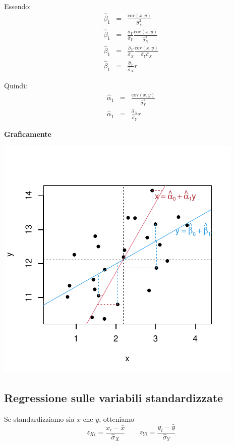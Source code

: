 \documentclass[
  11pt,
]{book}
\theoremstyle{mytheoremstyle}
\theoremstyle{mydefstyle}
\begin{document}
Essendo:
\begin{eqnarray*}
\hat\beta_1 &=&\frac{\text{cov}(x,y)}{\hat\sigma_X^2}\\
\hat\beta_1 &=&\frac{\hat\sigma_Y}{\hat\sigma_Y}\frac{\text{cov}(x,y)}{\hat\sigma_X^2}\\
\hat\beta_1 &=&\frac{\hat\sigma_Y}{\hat\sigma_X}\frac{\text{cov}(x,y)}{\hat\sigma_Y\hat\sigma_X}\\
\hat\beta_1 &=&\frac{\hat\sigma_Y}{\hat\sigma_X}r
\end{eqnarray*}

Quindi:
\begin{eqnarray*}
\hat\alpha_1 &=&\frac{\text{cov}(x,y)}{\hat\sigma_Y^2}\\
\hat\alpha_1 &=&\frac{\hat\sigma_X}{\hat\sigma_Y}r
\end{eqnarray*}

\textbf{Graficamente}

\begin{center}\includegraphics{Appunti_di_Statistica_2025_files/figure-latex/18-regressione-II-31-1} \end{center}

\subsection{Regressione sulle variabili standardizzate}\label{regressione-sulle-variabili-standardizzate}

Se standardizziamo sia \(x\) che \(y\), otteniamo
\[z_{Xi}=\frac{x_i-\bar x}{\hat\sigma_X}\qquad z_{Yi}=\frac{y_i-\bar y}{\hat\sigma_Y}\]
\end{document}
